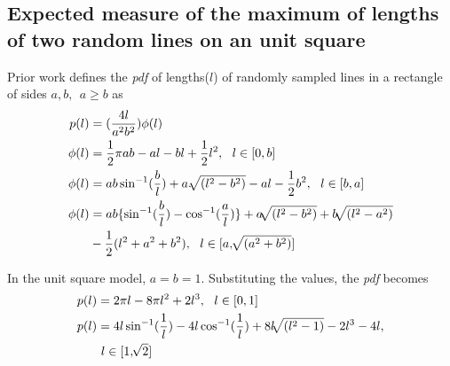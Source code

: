 \subsection{Expected measure of the maximum of lengths of two random lines on an unit square}
Prior work \cite{ghosh1951random} defines the \textit{pdf} of lengths($l$) of randomly sampled lines in a rectangle of sides $a,b, \ \ a\geq b$ as 
\begin{align*}
p(l) &= (\frac{4l}{a^2b^2})\phi(l)\\
\phi(l)&= \frac{1}{2}\pi a b - a l - b l + \frac{1}{2} l^2, \ \ l\in[0,b]\\
\phi(l)&= ab \sininv(\frac{b}{l}) + a. \sqrt[]{(l^2-b^2)} - al - \frac{1}{2}b^2, \ \ l\in[b,a]\\
\phi(l)&= ab\{\sininv(\frac{b}{l})-\cosinv(\frac{a}{l})\} + a\sqrt[]{(l^2-b^2)} + b\sqrt[]{(l^2-a^2)} \\
&- \frac{1}{2}(l^2+a^2+b^2),\ \ l\in[a,\sqrt[]{(a^2+b^2)}]
\end{align*}

In the unit square model, $a=b=1$. Substituting the values, the \textit{pdf} becomes
\begin{align*}
p(l)&= 2\pi l - 8\pi l^2 + 2l^3, \ \ l\in[0,1]\\
p(l)&= 4l\sin^{-1}(\frac{1}{l}) - 4l\cos^{-1}(\frac{1}{l}) + 8l\sqrt[]{(l^2-1)} -2l^3 -4l,\\ &\ l\in[1,\sqrt[]{2}]
\end{align*}

